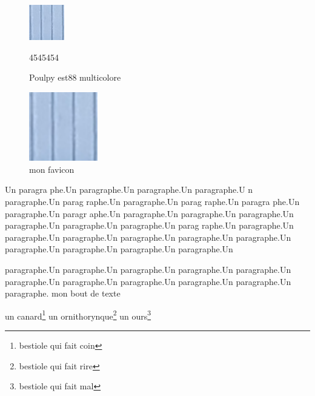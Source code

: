 \documentclass[10pt,twocolumn]{article}
\begin{document}
\begin{figure}[ht]
\begin{center}
\includegraphics{images/favicon.png} 
\caption{Poulpy est88 multicolore}4545454
\label{Tux}
\end{center}
\end{figure}


\begin{figure}
\begin{center}

\includegraphics[width=3cm]{images/favicon.png}
\caption{mon favicon}

\end{center}
\end{figure}

Un paragra phe.Un paragraphe.Un paragraphe.Un paragraphe.U n paragraphe.Un parag raphe.Un paragraphe.Un parag raphe.Un paragra phe.Un paragraphe.Un paragr aphe.Un paragraphe.Un paragraphe.Un paragraphe.Un paragraphe.Un paragraphe.Un paragraphe.Un parag raphe.Un paragraphe.Un paragraphe.Un paragraphe.Un paragraphe.Un paragraphe.Un paragraphe.Un paragraphe.Un paragraphe.Un paragraphe.Un paragraphe.Un 

paragraphe.Un paragraphe.Un paragraphe.Un paragraphe.Un paragraphe.Un paragraphe.Un paragraphe.Un paragraphe.Un paragraphe.Un paragraphe.Un paragraphe.
{\selectfont mon bout de texte}

un canard\footnote{bestiole qui fait coin}
un ornithorynque\footnote{bestiole qui fait rire}
un ours\footnote{bestiole qui fait mal}
\end{document}
